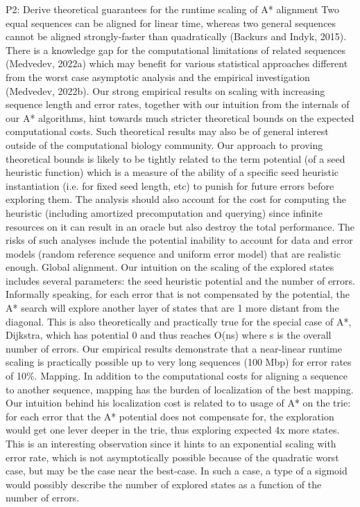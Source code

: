 P2: Derive theoretical guarantees for the runtime scaling of A* alignment Two
equal sequences can be aligned for linear time, whereas two general sequences
cannot be aligned strongly-faster than quadratically (Backurs and Indyk, 2015).
There is a knowledge gap for the computational limitations of related sequences
(Medvedev, 2022a) which may benefit for various statistical approaches different
from the worst case asymptotic analysis and the empirical investigation
(Medvedev, 2022b). Our strong empirical results on scaling with increasing
sequence length and error rates, together with our intuition from the internals
of our A* algorithms, hint towards much stricter theoretical bounds on the
expected computational costs. Such theoretical results may also be of general
interest outside of the computational biology community. Our approach to proving
theoretical bounds is likely to be tightly related to the term potential (of a
seed heuristic function) which is a measure of the ability of a specific seed
heuristic instantiation (i.e. for fixed seed length, etc) to punish for future
errors before exploring them. The analysis should also account for the cost for
computing the heuristic (including amortized precomputation and querying) since
infinite resources on it can result in an oracle but also destroy the total
performance. The risks of such analyses include the potential inability to
account for data and error models (random reference sequence and uniform error
model) that are realistic enough. Global alignment. Our intuition on the scaling
of the explored states includes several parameters: the seed heuristic potential
and the number of errors. Informally speaking, for each error that is not
compensated by the potential, the A* search will explore another layer of states
that are 1 more distant from the diagonal. This is also theoretically and
practically true for the special case of A*, Dijkstra, which has potential 0 and
thus reaches O(ns) where s is the overall number of errors. Our empirical
results demonstrate that a near-linear runtime scaling is practically possible
up to very long sequences (100 Mbp) for error rates of 10\%. Mapping. In
addition to the computational costs for aligning a sequence to another sequence,
mapping has the burden of localization of the best mapping. Our intuition behind
his localization cost is related to to usage of A* on the trie: for each error
that the A* potential does not compensate for, the exploration would get one
lever deeper in the trie, thus exploring expected 4x more states. This is an
interesting observation since it hints to an exponential scaling with error
rate, which is not asymptotically possible because of the quadratic worst case,
but may be the case near the best-case. In such a case, a type of a sigmoid
would possibly describe the number of explored states as a function of the
number of errors.

